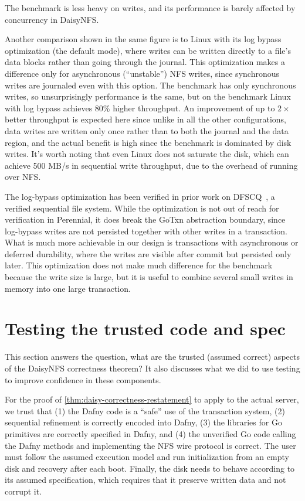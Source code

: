 The  benchmark is less heavy on writes, and its performance
is barely affected by concurrency in DaisyNFS.

Another comparison shown in the same figure is to Linux with its log bypass
optimization (the default  mode), where writes can be written
directly to a file's data blocks rather than going through the journal. This optimization
makes a difference only for asynchronous (``unstable'') NFS writes, since synchronous writes
are journaled even with this option. The  benchmark has only
synchronous writes, so unsurprisingly performance is the same, but on the
 benchmark Linux with log bypass achieves 80\% higher throughput. An
improvement of up to $2\times$ better throughput is expected here since unlike
in all the other configurations, data writes are written only once rather than
to both the journal and the data region, and the actual benefit is high since
the benchmark is dominated by disk writes. It's worth noting that even Linux
does not saturate the disk, which can achieve 500 MB/s in sequential write
throughput, due to the overhead of running over NFS.

The log-bypass optimization has been verified in prior work on
DFSCQ~\cite{chen:dfscq}, a verified sequential file system. While the
optimization is not out of reach for verification in Perennial, it does break
the GoTxn abstraction boundary, since log-bypass writes are not persisted
together with other writes in a transaction. What is much more achievable in our design is
transactions with asynchronous or deferred durability, where the writes are
visible after commit but persisted only later. This optimization does not make
much difference for the  benchmark because the write size is
large, but it is useful to combine several small writes in memory into one large
transaction.

\section{Testing the trusted code and spec}
\label{sec:eval:testing}

This section answers the question, what are the trusted (assumed correct)
aspects of the DaisyNFS correctness theorem? It also discusses what we did to
use testing to improve confidence in these components.

For the proof of \cref{thm:daisy-correctness-restatement} to apply to the actual server, we trust that (1) the
Dafny code is a ``safe'' use of the transaction system, (2) sequential
refinement is correctly encoded into Dafny, (3) the libraries for Go primitives
are correctly specified in Dafny, and (4) the unverified Go code calling the
Dafny methods and implementing the NFS wire protocol is correct. The
user must follow the assumed execution model and run initialization from an
empty disk and recovery after each boot. Finally, the disk needs to behave
according to its assumed specification, which requires that it preserve written
data and not corrupt it.

